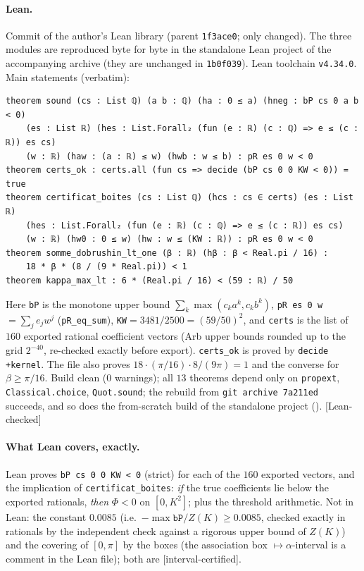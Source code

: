 \documentclass[11pt,a4paper]{article}
\theoremstyle{remark}
\theoremstyle{definition}
\newcommand{\st}[1]{\textsf{[#1]}}
\begin{document}
\paragraph{Lean.} Commit  of the author's Lean library (parent
\texttt{1f3ace0}; only  changed). The three modules are reproduced byte
for byte in the standalone Lean project  of the accompanying archive (they are unchanged in
\texttt{1b0f039}). Lean toolchain \texttt{v4.34.0}. Main statements (verbatim):
{\footnotesize
\begin{verbatim}
theorem sound (cs : List ℚ) (a b : ℚ) (ha : 0 ≤ a) (hneg : bP cs 0 a b < 0)
    (es : List ℝ) (hes : List.Forall₂ (fun (e : ℝ) (c : ℚ) => e ≤ (c : ℝ)) es cs)
    (w : ℝ) (haw : (a : ℝ) ≤ w) (hwb : w ≤ b) : pR es 0 w < 0
theorem certs_ok : certs.all (fun cs => decide (bP cs 0 0 KW < 0)) = true
theorem certificat_boites (cs : List ℚ) (hcs : cs ∈ certs) (es : List ℝ)
    (hes : List.Forall₂ (fun (e : ℝ) (c : ℚ) => e ≤ (c : ℝ)) es cs)
    (w : ℝ) (hw0 : 0 ≤ w) (hw : w ≤ (KW : ℝ)) : pR es 0 w < 0
theorem somme_dobrushin_lt_one (β : ℝ) (hβ : β < Real.pi / 16) :
    18 * β * (8 / (9 * Real.pi)) < 1
theorem kappa_max_lt : 6 * (Real.pi / 16) < (59 : ℝ) / 50
\end{verbatim}}
Here \texttt{bP} is the monotone upper bound $\sum_k\max(c_ka^k,c_kb^k)$, \texttt{pR es 0 w}${}=\sum_je_jw^j$
(\texttt{pR\_eq\_sum}), \texttt{KW}${}=3481/2500=(59/50)^2$, and \texttt{certs} is the list of $160$ exported
rational coefficient vectors (Arb upper bounds rounded up to the grid $2^{-40}$, re-checked exactly
before export). \texttt{certs\_ok} is proved by \texttt{decide +kernel}. The file also proves
$18\cdot(\pi/16)\cdot 8/(9\pi)=1$ and the converse for $\beta\ge\pi/16$.
Build clean (0 warnings); all $13$ theorems depend only on \texttt{propext}, \texttt{Classical.choice},
\texttt{Quot.sound}; the rebuild from \texttt{git archive 7a211ed} succeeds, and so does the from-scratch build of
the standalone project (). \st{Lean-checked}

\paragraph{What Lean covers, exactly.} Lean proves \texttt{bP cs 0 0 KW < 0} (strict) for each of the
$160$ exported vectors, and the implication of \texttt{certificat\_boites}: \emph{if} the true
coefficients lie below the exported rationals, \emph{then} $\Phi<0$ on $[0,K^2]$; plus the threshold
arithmetic. Not in Lean: the constant $0.0085$ (i.e.\ $-\max\texttt{bP}/Z(K)\ge0.0085$, checked exactly in
rationals by the independent check against a rigorous upper bound of $Z(K)$) and the covering of $[0,\pi]$ by the boxes
(the association box $\mapsto\alpha$-interval is a comment in the Lean file); both are
\st{interval-certified}.
\end{document}
